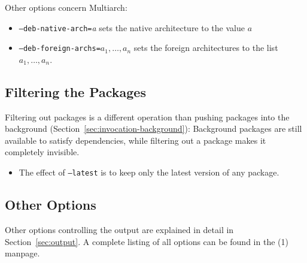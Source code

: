 Other options concern Multiarch:
\begin{itemize}
\item \texttt{--deb-native-arch=}\textit{a} sets the native architecture to the
  value $a$
\item \texttt{--deb-foreign-archs=}$a_1,\ldots,a_n$ sets the foreign 
  architectures to the list $a_1,\ldots,a_n$.
\end{itemize}


\subsection{Filtering the Packages}
Filtering out packages is a different operation than pushing packages
into the background (Section~\ref{sec:invocation-background}): Background
packages are still available to satisfy dependencies, while filtering out a 
package makes it completely invisible.

\begin{itemize}
\item The effect of \texttt{--latest} is to keep only the latest version of any
package.
\end{itemize}


\subsection{Other Options}
Other options controlling the output are explained in detail in
Section~\ref{sec:output}. A complete listing of all options can be found in
the \debcheck(1) manpage.


